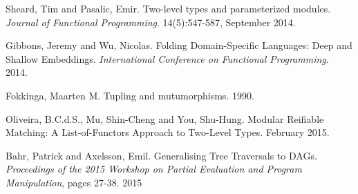 \documentclass[nocopyrightspace]{sigplanconf}
\begin{document}
\begin{thebibliography}{}
\softraggedright

  Sheard, Tim and Pasalic, Emir.
  Two-level types and parameterized modules.
  \emph{Journal of Functional Programming}.
  14(5):547-587, September 2014.

  Gibbons, Jeremy and Wu, Nicolas.
  Folding Domain-Specific Languages: Deep and Shallow Embeddings.
  \emph{International Conference on Functional Programming}.
  2014.

  Fokkinga, Maarten M.
  Tupling and mutumorphisms.
  1990.

  Oliveira, B.C.d.S., Mu, Shin-Cheng and You, Shu-Hung.
  Modular Reifiable Matching: A List-of-Functors Approach to Two-Level Types.
  February 2015.

  Bahr, Patrick and Axelsson, Emil.
  Generalising Tree Traversals to DAGs.
  \emph{Proceedings of the 2015 Workshop on Partial Evaluation and Program Manipulation},
  pages 27-38.
  2015



\end{thebibliography}
\end{document}
